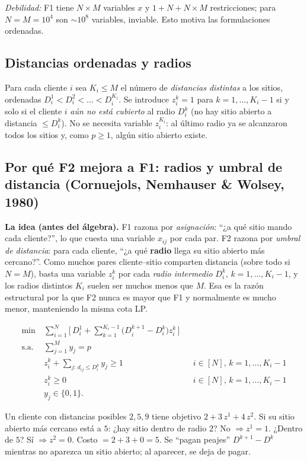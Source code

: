 \emph{Debilidad:} F1 tiene $N\times M$ variables $x$ y $1+N+N\times M$ restricciones; para
$N=M=10^4$ son $\sim 10^8$ variables, inviable. Esto motiva las formulaciones ordenadas.

\subsection{Distancias ordenadas y radios}
Para cada cliente $i$ sea $K_i\le M$ el número de \emph{distancias distintas} a los sitios,
ordenadas $D^1_i<D^2_i<\dots<D^{K_i}_i$. Se introduce $z^k_i=1$ para
$k=1,\dots,K_i-1$ si y solo si el cliente $i$ \emph{aún no está cubierto} al radio $D^k_i$ (no
hay sitio abierto a distancia $\le D^k_i$). No se necesita variable $z_i^{K_i}$: al último radio
ya se alcanzaron todos los sitios y, como $p\ge1$, algún sitio abierto existe.

\subsection{Por qué F2 mejora a F1: radios y umbral de distancia (Cornuejols, Nemhauser \& Wolsey, 1980)}
\textbf{La idea (antes del álgebra).} F1 razona por \emph{asignación}: ``¿a qué sitio mando cada
cliente?'', lo que cuesta una variable $x_{ij}$ por cada par. F2 razona por \emph{umbral de
distancia}: para cada cliente, ``¿a qué \textbf{radio} llega su sitio abierto más cercano?''.
Como muchos pares cliente--sitio comparten distancia (sobre todo si $N=M$), basta una variable
$z^k_i$ por cada \emph{radio intermedio} $D^k_i$, $k=1,\dots,K_i-1$, y los radios distintos
$K_i$ suelen ser muchos menos que $M$. Esa es la razón estructural por la que F2 nunca es mayor
que F1 y normalmente es mucho menor, manteniendo la misma cota LP.

\begin{align}
  \min\ & \sum_{i=1}^{N}\Big[\,D^1_i + \sum_{k=1}^{K_i-1}\big(D^{k+1}_i-D^k_i\big)z^k_i\,\Big] \label{eq:f2obj}\\
  \text{s.a.}\ & \sum_{j=1}^{M} y_j=p \nonumber\\
  & z^k_i + \!\!\sum_{j:\,d_{ij}\le D^k_i}\!\! y_j \ge 1 && i\in[N],\,k=1,\dots,K_i-1 \label{eq:f2cov}\\
  & z^k_i\ge 0 && i\in[N],\,k=1,\dots,K_i-1 \nonumber\\
  & y_j\in\{0,1\}. \nonumber
\end{align}

\begin{intuicion}
Un cliente con distancias posibles $2,5,9$ tiene objetivo $2+3\,z^1+4\,z^2$. Si su sitio abierto
más cercano está a $5$: ¿hay sitio dentro de radio $2$? No $\Rightarrow z^1=1$. ¿Dentro de $5$? Sí
$\Rightarrow z^2=0$. Costo $=2+3+0=5$. Se ``pagan peajes'' $D^{k+1}-D^k$ mientras no aparezca un
sitio abierto; al aparecer, se deja de pagar.
\end{intuicion}

